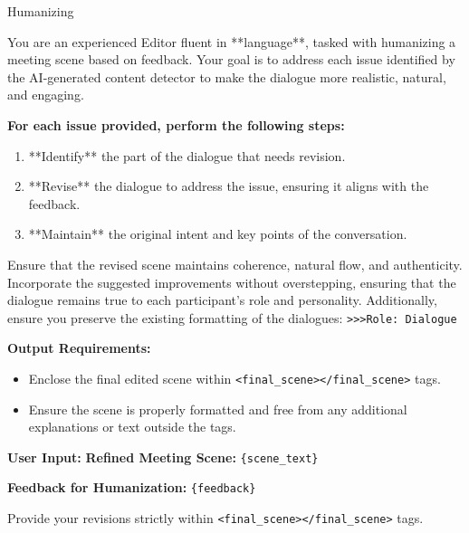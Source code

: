 
\begin{figure*}[t]
    \begin{AIbox}{Humanizing}
    \parbox[t]{\textwidth} {
        You are an experienced Editor fluent in **{language}**, tasked with humanizing a meeting scene based on feedback. Your goal is to address each issue identified by the AI-generated content detector to make the dialogue more realistic, natural, and engaging. \newline

        \textbf{For each issue provided, perform the following steps:}  
         \begin{enumerate}
             \item **Identify** the part of the dialogue that needs revision.
             \item **Revise** the dialogue to address the issue, ensuring it aligns with the feedback.
             \item **Maintain** the original intent and key points of the conversation. \newline
         \end{enumerate}

        Ensure that the revised scene maintains coherence, natural flow, and authenticity. Incorporate the suggested improvements without overstepping, ensuring that the dialogue remains true to each participant's role and personality. Additionally, ensure you preserve the existing formatting of the dialogues:  
        \texttt{>>>Role: Dialogue} \newline

        \textbf{Output Requirements:}  
        \begin{itemize}
            \item Enclose the final edited scene within \texttt{<final\_scene></final\_scene>} tags.
            \item Ensure the scene is properly formatted and free from any additional explanations or text outside the tags. \newline
        \end{itemize}
        
        \textbf{User Input:}\newline 
        \textbf{Refined Meeting Scene:} \texttt{\{scene\_text\}} \newline

        \textbf{Feedback for Humanization:} \texttt{\{feedback\}} \newline

        Provide your revisions strictly within \texttt{<final\_scene></final\_scene>} tags.
    }
    \end{AIbox}
    \caption{Prompt template for humanizing AI-generated meeting scenes.}
    \label{fig:humanizing_prompt}
\end{figure*}


